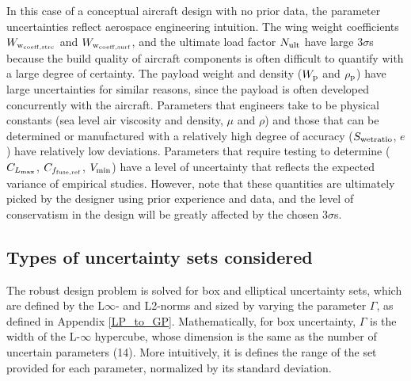 In this case of a conceptual aircraft design with no prior data,
the parameter uncertainties reflect aerospace engineering intuition.
The wing weight coefficients $W_{\rm{w}_{\rm{coeff,strc}}}$ and $W_{\rm{w}_{\rm{coeff,surf}}}$,
and the ultimate load factor $N_{\rm{ult}}$ have
large $3\sigma$s because the build quality of aircraft components is
often difficult to quantify with a large degree of certainty.
The payload weight and density ($W_{\rm{p}}$ and $\rho_{\rm{p}}$) have large uncertainties for similar reasons,
since the payload is often developed concurrently with the aircraft.
Parameters that engineers take to be
physical constants (sea level air viscosity and density, $\mu$ and $\rho$) and those that can be determined or manufactured with a relatively
high degree of accuracy ($S_{\rm{wetratio}}$, $e$) have relatively low deviations.
Parameters that require testing to determine ($C_{L_{\rm{max}}}$, $C_{f_{\rm{fuse, ref}}}$,
$V_{\rm{min}}$) have a level of uncertainty
that reflects the expected variance of empirical studies. However, note that
these quantities are ultimately picked by the designer using prior experience and data,
and the level of conservatism in the
design will be greatly affected by the chosen $3\sigma$s.

\subsection{Types of uncertainty sets considered}

The robust design problem is solved for box and elliptical uncertainty sets,
which are defined by the L$\infty$- and L2-norms and sized
by varying the parameter $\Gamma$, as defined in Appendix \ref{LP_to_GP}. Mathematically, for box uncertainty,
$\Gamma$ is the width of the L-$\infty$ hypercube, whose dimension is the same as the number of uncertain parameters (14). More intuitively,
it is defines the range of the set provided for each parameter, normalized by its standard deviation.

